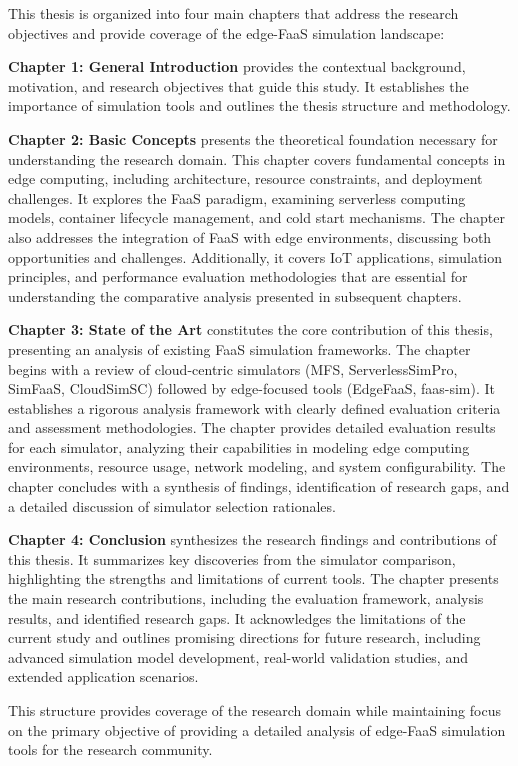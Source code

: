 This thesis is organized into four main chapters that address the research objectives and provide coverage of the edge-FaaS simulation landscape:

\textbf{Chapter 1: General Introduction} provides the contextual background, motivation, and research objectives that guide this study. It establishes the importance of simulation tools and outlines the thesis structure and methodology.

\textbf{Chapter 2: Basic Concepts} presents the theoretical foundation necessary for understanding the research domain. This chapter covers fundamental concepts in edge computing, including architecture, resource constraints, and deployment challenges. It explores the FaaS paradigm, examining serverless computing models, container lifecycle management, and cold start mechanisms. The chapter also addresses the integration of FaaS with edge environments, discussing both opportunities and challenges. Additionally, it covers IoT applications, simulation principles, and performance evaluation methodologies that are essential for understanding the comparative analysis presented in subsequent chapters.

\textbf{Chapter 3: State of the Art} constitutes the core contribution of this thesis, presenting an analysis of existing FaaS simulation frameworks. The chapter begins with a review of cloud-centric simulators (MFS, ServerlessSimPro, SimFaaS, CloudSimSC) followed by edge-focused tools (EdgeFaaS, faas-sim). It establishes a rigorous analysis framework with clearly defined evaluation criteria and assessment methodologies. The chapter provides detailed evaluation results for each simulator, analyzing their capabilities in modeling edge computing environments, resource usage, network modeling, and system configurability. The chapter concludes with a synthesis of findings, identification of research gaps, and a detailed discussion of simulator selection rationales.

\textbf{Chapter 4: Conclusion} synthesizes the research findings and contributions of this thesis. It summarizes key discoveries from the simulator comparison, highlighting the strengths and limitations of current tools. The chapter presents the main research contributions, including the evaluation framework, analysis results, and identified research gaps. It acknowledges the limitations of the current study and outlines promising directions for future research, including advanced simulation model development, real-world validation studies, and extended application scenarios.

This structure provides coverage of the research domain while maintaining focus on the primary objective of providing a detailed analysis of edge-FaaS simulation tools for the research community.